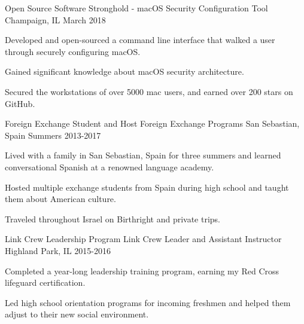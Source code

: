 

\begin{cventries}
\cventry
{Open Source Software} %
{Stronghold - macOS Security Configuration Tool} %
{Champaign, IL} %
{March 2018} %
{
	\begin{cvitems} %
		\item {Developed and open-sourced a command line interface that walked a user through securely configuring macOS.}
		\item{Gained significant knowledge about macOS security architecture.} 
		\item {Secured the workstations of over 5000 mac users, and earned over 200 stars on GitHub.}
	\end{cvitems}
}
\cventry
{Foreign Exchange Student and Host} %
{Foreign Exchange Programs} %
{San Sebastian, Spain} %
{Summers 2013-2017} %
{
	\begin{cvitems} %
		\item {Lived with a family in San Sebastian, Spain for three summers and learned conversational Spanish at a renowned language academy.}
		\item {Hosted multiple exchange students from Spain during high school and taught them about American culture.}
		\item {Traveled throughout Israel on Birthright and private trips.}
	\end{cvitems}
}
\cventry
{Link Crew Leadership Program} %
{\newline Link Crew Leader and Assistant Instructor} %
{Highland Park, IL} %
{2015-2016} %
{
   \begin{cvitems} %
        \item {Completed a year-long leadership training program, earning my Red Cross lifeguard certification.}
        \item {Led high school orientation programs for incoming freshmen and helped them adjust to their new social environment.}
   \end{cvitems}
} 
\end{cventries}
